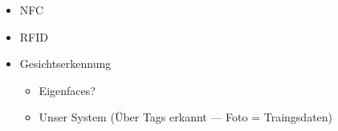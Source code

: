 \begin{itemize}
	\item NFC
	\item RFID
	\item Gesichtserkennung	
	\begin{itemize}
		\item Eigenfaces?
		\item Unser System (Über Tags erkannt --- Foto = Traingsdaten)
	\end{itemize}
\end{itemize}